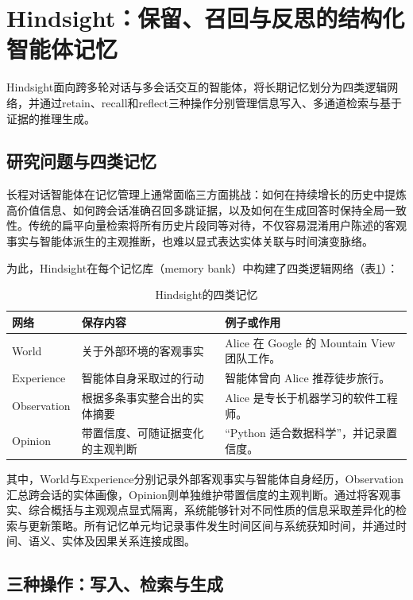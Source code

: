 \section{Hindsight：保留、召回与反思的结构化智能体记忆}
\label{sec:hindsight}

Hindsight面向跨多轮对话与多会话交互的智能体，将长期记忆划分为四类逻辑网络，并通过retain、recall和reflect三种操作分别管理信息写入、多通道检索与基于证据的推理生成。

\subsection{研究问题与四类记忆}

长程对话智能体在记忆管理上通常面临三方面挑战：如何在持续增长的历史中提炼高价值信息、如何跨会话准确召回多跳证据，以及如何在生成回答时保持全局一致性。传统的扁平向量检索将所有历史片段同等对待，不仅容易混淆用户陈述的客观事实与智能体派生的主观推断，也难以显式表达实体关联与时间演变脉络。

为此，Hindsight在每个记忆库（memory bank）中构建了四类逻辑网络（表\ref{tab:hindsight-types}）：
\begin{table}[!htbp]
\centering
\caption{Hindsight的四类记忆}
\label{tab:hindsight-types}
\begin{tabularx}{\linewidth}{@{}p{2.5cm}XX@{}}
\toprule
网络 & 保存内容 & 例子或作用 \\
\midrule
World & 关于外部环境的客观事实 & Alice 在 Google 的 Mountain View 团队工作。 \\
Experience & 智能体自身采取过的行动 & 智能体曾向 Alice 推荐徒步旅行。 \\
Observation & 根据多条事实整合出的实体摘要 & Alice 是专长于机器学习的软件工程师。 \\
Opinion & 带置信度、可随证据变化的主观判断 & “Python 适合数据科学”，并记录置信度。 \\
\bottomrule
\end{tabularx}
\end{table}
其中，World与Experience分别记录外部客观事实与智能体自身经历，Observation汇总跨会话的实体画像，Opinion则单独维护带置信度的主观判断。通过将客观事实、综合概括与主观观点显式隔离，系统能够针对不同性质的信息采取差异化的检索与更新策略。所有记忆单元均记录事件发生时间区间与系统获知时间，并通过时间、语义、实体及因果关系连接成图。

\subsection{三种操作：写入、检索与生成}

